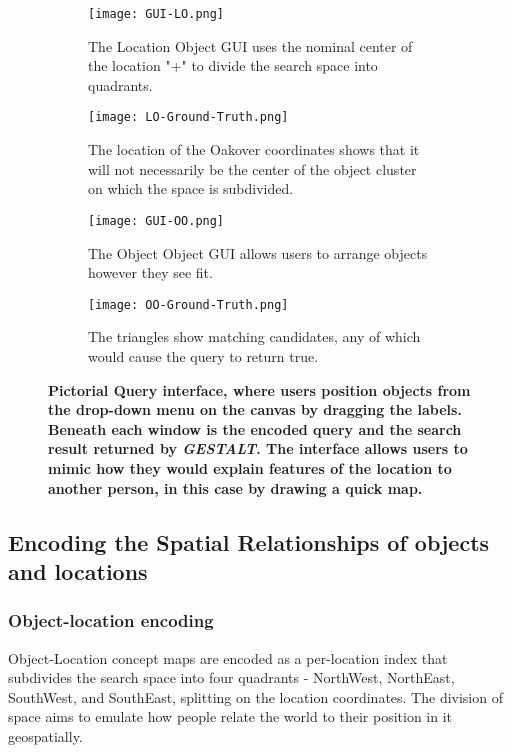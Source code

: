 \begin{figure*}[h]
    \centering
    \begin{subfigure}[t]{.2\textwidth} 
        \texttt{[image: GUI-LO.png]}
        \caption{\small The Location Object GUI uses the nominal center of the location "+" to divide the search space into quadrants.}
        \label{fig:GUI-LO}
    \end{subfigure}
    \hfill
    \begin{subfigure}[t]{.2\textwidth} 
        \texttt{[image: LO-Ground-Truth.png]}
        \caption{\small The location of the Oakover coordinates shows that it will not necessarily be the center of the object cluster on which the space is subdivided.}
        \label{fig:LO-Ground-Truth}
    \end{subfigure}
    \hfill
    \begin{subfigure}[t]{.2\textwidth}
        \texttt{[image: GUI-OO.png]}
        \caption{\small The Object Object GUI allows users to arrange objects however they see fit.}
        \label{fig:GUI-OO}
    \end{subfigure}
    \hfill
    \begin{subfigure}[t]{.2\textwidth} 
        \texttt{[image: OO-Ground-Truth.png]}
        \caption{\small The triangles show matching candidates, any of which would cause the query to return true.}
        \label{fig:OO-Ground-Truth}
    \end{subfigure}
    \hfill
    \caption{\textbf{Pictorial Query interface, where users position objects from the drop-down menu on the canvas by dragging the labels. Beneath each window is the encoded query and the search result returned by \emph{GESTALT}. The interface allows users to mimic how they would explain features of the location to another person, in this case by drawing a quick map.}}\label{figure:GUI} 
\end{figure*}

\subsection{Encoding the Spatial Relationships of objects and locations}

\subsubsection{Object-location encoding}
Object-Location concept maps are encoded as a per-location index that subdivides the search space into four quadrants - NorthWest, NorthEast, SouthWest, and SouthEast, splitting on the location coordinates. The division of space aims to emulate how people relate the world to their position in it geospatially. 


